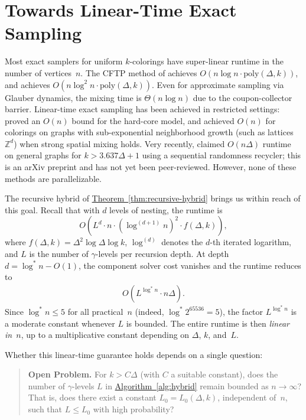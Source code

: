 \documentclass[12pt, a4paper]{article}
\theoremstyle{plain}
\theoremstyle{definition}
\theoremstyle{remark}
\newcommand{\intg}{\mathbb{Z}}
\newcommand{\lt}{\left}
\newcommand{\rt}{\right}
\newcommand{\sref}[2]{\hyperref[#2]{#1~\ref*{#2}}}
\begin{document}
\section{Towards Linear-Time Exact Sampling}\label{sec:linear-time}

Most exact samplers for uniform \(k\)-colorings have super-linear runtime in the number of vertices~\(n\). The CFTP method of \cite{MH96} achieves \(O(n\log n\cdot\mathrm{poly}(\Delta,k))\), and \cite{BC20} achieves \(O(n\log^2 n\cdot\mathrm{poly}(\Delta,k))\). Even for approximate sampling via Glauber dynamics, the mixing time is \(\Theta(n\log n)\) due to the coupon-collector barrier. Linear-time exact sampling has been achieved in restricted settings: \cite{GJL17} proved an \(O(n)\) bound for the hard-core model, and \cite{FGY22} achieved \(O(n)\) for colorings on graphs with sub-exponential neighborhood growth (such as lattices~\(\intg^d\)) when strong spatial mixing holds. Very recently, \cite{BH25} claimed \(O(n\Delta)\) runtime on general graphs for \(k > 3.637\Delta + 1\) using a sequential randomness recycler; this is an arXiv preprint and has not yet been peer-reviewed. However, none of these methods are parallelizable.

The recursive hybrid of \sref{Theorem}{thm:recursive-hybrid} brings us within reach of this goal. Recall that with \(d\) levels of nesting, the runtime is
\[
O\!\lt(L^d \cdot n \cdot (\log^{(d+1)} n)^2 \cdot f(\Delta,k)\rt),
\]
where \(f(\Delta,k) = \Delta^2\log\Delta\log k\), \(\log^{(d)}\) denotes the \(d\)-th iterated logarithm, and \(L\) is the number of \(\gamma\)-levels per recursion depth. At depth \(d = \log^* n - O(1)\), the component solver cost vanishes and the runtime reduces to
\begin{align}\label{eqn:recursive-limit}
O(L^{\log^* n}\cdot n\Delta).
\end{align}
Since \(\log^* n \leq 5\) for all practical~\(n\) (indeed, \(\log^* 2^{65536} = 5\)), the factor \(L^{\log^* n}\) is a moderate constant whenever \(L\) is bounded. The entire runtime is then {\em linear in~\(n\)}, up to a multiplicative constant depending on \(\Delta\), \(k\), and~\(L\).

Whether this linear-time guarantee holds depends on a single question:

\begin{quote}
\textbf{Open Problem.} For \(k > C\Delta\) (with \(C\) a suitable constant), does the number of \(\gamma\)-levels \(L\) in \sref{Algorithm}{alg:hybrid} remain bounded as \(n\to\infty\)? That is, does there exist a constant \(L_0 = L_0(\Delta, k)\), independent of~\(n\), such that \(L \leq L_0\) with high probability?
\end{quote}
\end{document}
